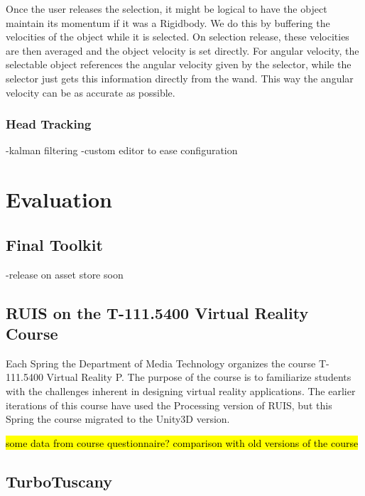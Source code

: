 \documentclass[12pt,a4paper,oneside,pdftex]{report}
\begin{document}
Once the user releases the selection, it might be logical to have the object maintain its momentum if it was a Rigidbody. We do this by buffering the velocities of the object while it is selected. On selection release, these velocities are then averaged and the object velocity is set directly. For angular velocity, the selectable object references the angular velocity given by the selector, while the selector just gets this information directly from the wand. This way the angular velocity can be as accurate as possible.

\subsection{Head Tracking}
\label{subsection:wandcontrollers:headtracking}

-kalman filtering
-custom editor to ease configuration



\chapter{Evaluation}
\label{chapter:evaluation}

\section{Final Toolkit}
\label{section:finaltoolkit}

-release on asset store soon

\section{RUIS on the T-111.5400 Virtual Reality Course}
\label{section:vrcourse}

Each Spring the Department of Media Technology organizes the course T-111.5400 Virtual Reality P. The purpose of the course is to familiarize students with the challenges inherent in designing virtual reality applications. The earlier iterations of this course have used the Processing version of RUIS, but this Spring the course migrated to the Unity3D version. 

\hl{some data from course questionnaire? comparison with old versions of the course}

\section{TurboTuscany}
\label{section:turbotuscany}
\end{document}
